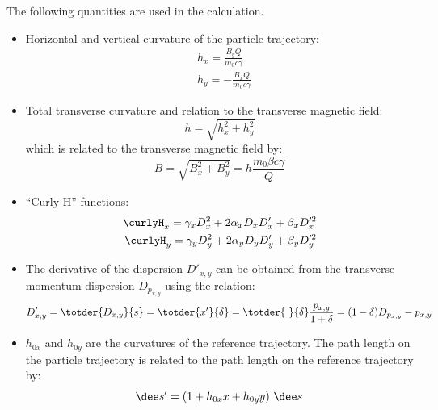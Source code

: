 The following quantities are used in the calculation.
\begin{itemize}
\item Horizontal and vertical curvature of the particle trajectory:
\begin{align}
    &h_x = \frac{B_y Q}{m_0 c \gamma}    \label{eq:curvx}\\
    &h_y = -\frac{B_x Q}{m_0 c \gamma}   \label{eq:curvy}
\end{align}
\item Total transverse curvature and relation to the transverse magnetic field:
\begin{equation}
    h = \sqrt{h_x^2 + h_y^2}
\end{equation}
which is related to the transverse magnetic field by:
\begin{equation}
    B = \sqrt{B_x^2 + B_y^2}  = h  \frac{m_0 \beta c \gamma}{Q}
    \label{eq:btocurv}
\end{equation}
\item ``Curly H'' functions:
\begin{align}
    \curlyH_x = \gamma_x D_x^2 + 2 \alpha_x D_x D_x' + \beta_x D_x'^2\\
    \curlyH_y = \gamma_y D_y^2 + 2 \alpha_y D_y D_y' + \beta_y D_y'^2
\end{align}
\item The derivative of the dispersion $D'_{x,y}$ can be obtained from the transverse
momentum dispersion $D_{p_{x,y}}$ using the relation:
\begin{equation}
    D'_{x,y} = \totder{D_{x,y}}{s} = \totder{x'}{\delta} =
      \totder{~}{\delta} \frac{p_{x,y}}{1+\delta} = (1 - \delta)D_{p_{x,y}} - p_{x,y}
    \label{eq:ddispder}
\end{equation}
\item $h_{0x}$ and $h_{0y}$ are the curvatures of the reference trajectory. The path
length on the particle trajectory is related to the path length on the reference trajectory by:
\begin{equation}
    \dee s' = (1 + h_{0x}x + h_{0y}y)\ \dee s
    \label{eq:pathlength}
\end{equation}
\end{itemize}

